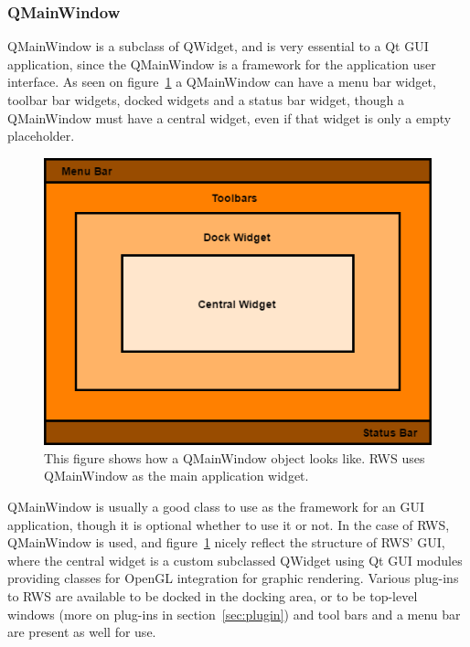 \subsubsection{QMainWindow}
QMainWindow is a subclass of QWidget, and is very essential to a Qt GUI application, since the QMainWindow is a framework for the application user interface. As seen on figure~\ref{fig:QMainWindowExample} a QMainWindow can have a menu bar widget, toolbar bar widgets, docked widgets and a status bar widget, though a QMainWindow must have a central widget, even if that widget is only a empty placeholder. 

\begin{figure}[h]
	\centering
	\includegraphics[scale=0.55]{Figures/QMainWindowExample.png}
	\caption{This figure shows how a QMainWindow object looks like. RWS uses QMainWindow as the main application widget.}
	\label{fig:QMainWindowExample}
\end{figure}

QMainWindow is usually a good class to use as the framework for an GUI application, though it is optional whether to use it or not. In the case of RWS, QMainWindow is used, and figure~\ref{fig:QMainWindowExample} nicely reflect the structure of RWS' GUI, where the central widget is a custom subclassed QWidget using Qt GUI modules providing classes for OpenGL integration for graphic rendering. Various plug-ins to RWS are available to be docked in the docking area, or to be top-level windows (more on plug-ins in section~\ref{sec:plugin}) and tool bars and a menu bar are present as well for use.

